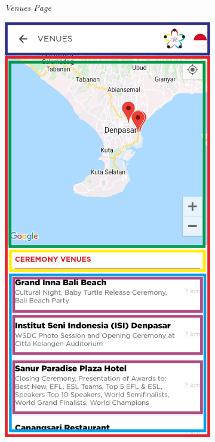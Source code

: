 \begin{enumerate}
\begin{figure}[H]
\begin{subfigure}[b]{0.21\textwidth}
	    \caption{{\it Venues Page}}
	    \label{fig:VenuePageWireframe}
     \end{subfigure}
     \hfill
     \begin{subfigure}[b]{0.247\textwidth}
    \centering
	    \includegraphics[scale=0.4]{Gambar/VenueMapPageWireframe.png}

\end{subfigure}
\end{figure}
\end{enumerate}
